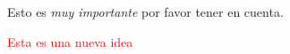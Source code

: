 Esto es \emph{muy importante} por favor tener en cuenta.



\textcolor{red}{Esta es una nueva idea}









%
